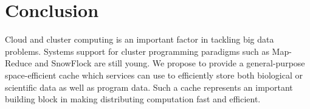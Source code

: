 \documentclass{article}[12pt]
\begin{document}
\section{Conclusion}
\label{sec:conclusion}

Cloud and cluster computing is an important factor in tackling big data
problems.  Systems support for cluster programming paradigms such as Map-Reduce
and SnowFlock are still young.  We propose to provide a general-purpose
space-efficient cache which services can use to efficiently store both
biological or scientific data as well as program data.  Such a cache represents
an important building block in making distributing computation fast and
efficient.

\newpage


\end{document}
